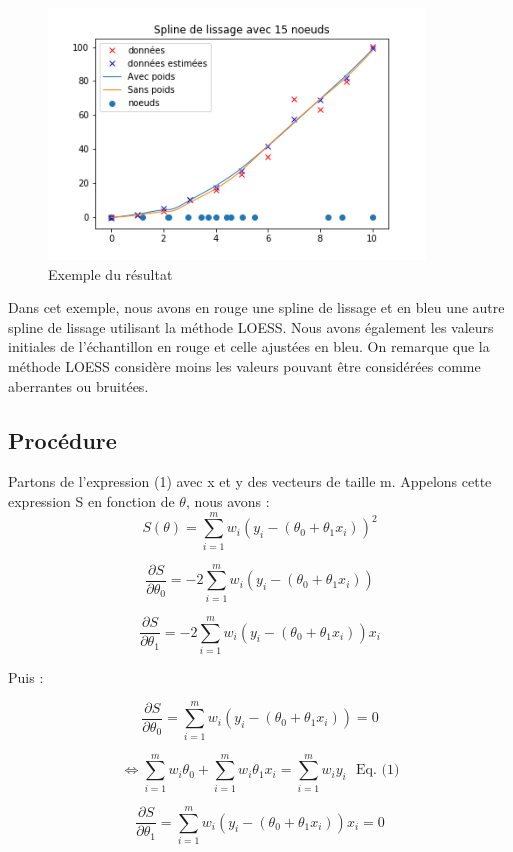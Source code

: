 \documentclass[a4paper,12pt]{article} %
\begin{document}
\begin{figure}[htp]
    \centering
    \includegraphics[width=10cm]{IMG_Tache5b_nonunif}
    \caption{Exemple du résultat }
    \label{fig:uniforme}
\end{figure}

Dans cet exemple, nous avons en rouge une spline de lissage et en bleu une autre spline de lissage utilisant la méthode LOESS.  Nous avons également les valeurs initiales de l'échantillon en rouge et celle ajustées en bleu. On remarque que la méthode LOESS considère moins les valeurs pouvant être considérées comme aberrantes ou bruitées.



\subsection{Procédure}

Partons de l'expression (1) avec  x et y  des vecteurs de taille m. Appelons cette expression S en fonction de $\theta$, nous avons :
\[S(\theta) = \sum_{i=1}^m w_i \left( y_i - (\theta_0 + \theta_1 x_i) \right)^2\]

\[\frac{\partial S}{\partial \theta_0} = -2 \sum_{i=1}^m w_i \left( y_i - (\theta_0 + \theta_1 x_i) \right) \]

\[ \frac{\partial S}{\partial \theta_1} = -2 \sum_{i=1}^m w_i \left( y_i - (\theta_0 + \theta_1 x_i) \right) x_i \]


Puis :

\[\frac{\partial S}{\partial \theta_0} = \sum_{i=1}^m w_i \left( y_i - (\theta_0 + \theta_1 x_i) \right)  = 0\]

\[ \iff \sum_{i=1}^m w_i  \theta_0 + \sum_{i=1}^m w_i  \theta_1 x_i  = \sum_{i=1}^m w_i y_i  \ \ \ \text{Eq. (1)}\]

\[\frac{\partial S}{\partial \theta_1} = \sum_{i=1}^m w_i \left( y_i - (\theta_0 + \theta_1 x_i) \right) x_i  = 0\] 
\end{document}
